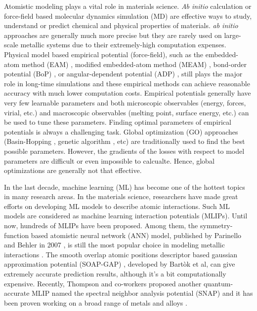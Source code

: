 \documentclass[prb,reprint,superscriptaddress]{revtex4-2}
\begin{document}
Atomistic modeling plays a vital role in materials science. \textit{Ab initio} 
calculation or force-field based molecular dynamics simulation (MD) are 
effective ways to study, understand or predict chemical and physical properties 
of materials. \textit{ab initio} approaches are generally much more precise but 
they are rarely used on large-scale metallic systems due to their extremely-high 
computation expenses. Physical model based empirical potential (force-field), 
such as the embedded-atom method (EAM) \cite{EAM0,EAM1,EAM2,EAM3,EAM4}, 
modified embedded-atom method (MEAM) \cite{MEAM0,MEAM1,MEAM2,MEAM_Jelinek}, 
bond-order potential (BoP) \cite{BOP0,BOP1,BOP2,BOP3}, or angular-dependent 
potential (ADP) \cite{ADP0,ADP1,ADP2,ADP3,ADP_FeNi}, still plays the major role 
in long-time simulations and these empirical methods can achieve reasonable 
accuracy with much lower computation costs. Empirical potentials 
generally have very few learnable parameters and both microscopic observables 
(energy, forces, virial, etc.) and macroscopic observables (melting 
point, surface energy, etc.) can be used to tune these parameters. Finding 
optimal parameters of empirical potentials is always a challenging task. Global 
optimization (GO) approaches (Basin-Hopping \cite{BH0,BH1}, genetic algorithm 
\cite{PCIPY,PGA}, etc) are traditionally used to find the best possible 
parameters. However, the gradients of the losses with respect to model 
parameters are difficult or even impossible to calcualte. Hence, 
global optimizations are generally not that effective.

In the last decade, machine learning (ML) has become one of the hottest 
topics in many research areas. In the materials science, researchers have made 
great efforts on developing ML models to describe atomic interactions. Such ML 
models are considered as machine learning interaction potentials (MLIPs). Until 
now, hundreds of MLIPs have been proposed. Among them, the symmetry-function 
based atomistic neural network (ANN) model, published by Parinello and Behler in 
2007 \cite{SF2007,SF1,SF2,SF3,SF4}, is still the most popular choice in modeling 
metallic interactions \cite{SFApp0,SFApp1,SFApp2}. 
The smooth overlap atomic positions descriptor based gaussian approximation 
potential (SOAP-GAP) \cite{soap0,soap1,soap2,soap3}, developed by Bartòk et al, 
can give extremely accurate prediction results, although it's a bit 
computationally expensive. 
Recently, Thompson and co-workers proposed another quantum-accurate MLIP named 
the spectral neighbor analysis potential (SNAP) \cite{SNAP_Algo} and it has 
been proven working on a broad range of metals and 
alloys \cite{SNAP_Mo,SNAP,SNAP_New}.
\end{document}
